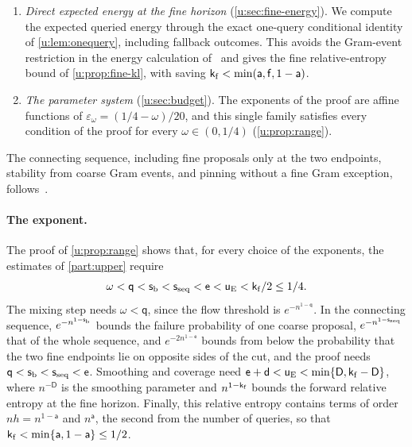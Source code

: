\begin{enumerate}
horizon. On this mesh, adjacent cells have different lengths, and
the estimates distinguish the duration of the previous cell, which governs
the conditional law of the spins, from that of the next cell, which
normalizes the query. For instance, the bound on the conditional
correlations of the query entries with the spins in \cref{u:sec:fine-energy}
loses a factor two compared with equal cells.
\item \emph{Direct expected energy at the fine horizon}
(\cref{u:sec:fine-energy}). We compute the expected queried energy through
the exact one-query conditional identity of \cref{u:lem:onequery}, including
fallback outcomes. This avoids the Gram-event restriction in the energy
calculation of~\cite[Section~4, Proposition~5]{oai-typical-upper} and gives
the fine relative-entropy bound of \cref{u:prop:fine-kl}, with saving
$\mathsf k_{\rm f}<\min(\mathsf a,\mathsf f,1-\mathsf a)$.
\item \emph{The parameter system} (\cref{u:sec:budget}). The exponents of the
proof are affine functions of $\varepsilon_\omega=(1/4-\omega)/20$, and this
single family satisfies every condition of the proof for every
$\omega\in(0,1/4)$ (\cref{u:prop:range}).
\end{enumerate}

The connecting sequence, including fine proposals only at the two
endpoints, stability from coarse Gram events, and pinning without a fine
Gram exception, follows~\cite[Section~6, proof of
Proposition~7]{oai-typical-upper}.

\paragraph{The exponent.}
The proof of \cref{u:prop:range} shows that, for every choice of the
exponents, the estimates of \cref{part:upper} require
\[
 \omega<\mathsf q<\mathsf s_{\rm b}<\mathsf s_{\rm seq}<\mathsf e<\mathsf u_{\rm E}
 <\mathsf k_{\rm f}/2\le1/4 .
\]
The mixing step needs $\omega<\mathsf q$, since the flow threshold is
$e^{-n^{1-\mathsf q}}$. In the connecting sequence, $e^{-n^{1-\mathsf s_{\rm b}}}$
bounds the failure probability of one coarse proposal,
$e^{-n^{1-\mathsf s_{\rm seq}}}$ that of the whole sequence, and
$e^{-2n^{1-\mathsf e}}$ bounds from below the probability that the two fine
endpoints lie on opposite sides of the cut, and the proof needs
$\mathsf q<\mathsf s_{\rm b}<\mathsf s_{\rm seq}<\mathsf e$. Smoothing and
coverage need $\mathsf e+\mathsf d<\mathsf u_{\rm E}
<\min\{\mathsf D,\mathsf k_{\rm f}-\mathsf D\}$, where $n^{-\mathsf D}$ is the
smoothing parameter and $n^{1-\mathsf k_{\rm f}}$ bounds the forward relative
entropy at the fine horizon. Finally, this relative entropy contains terms of
order $nh=n^{1-\mathsf a}$ and $n^{\mathsf a}$, the second from the number of
queries, so that $\mathsf k_{\rm f}<\min\{\mathsf a,1-\mathsf a\}\le1/2$.


